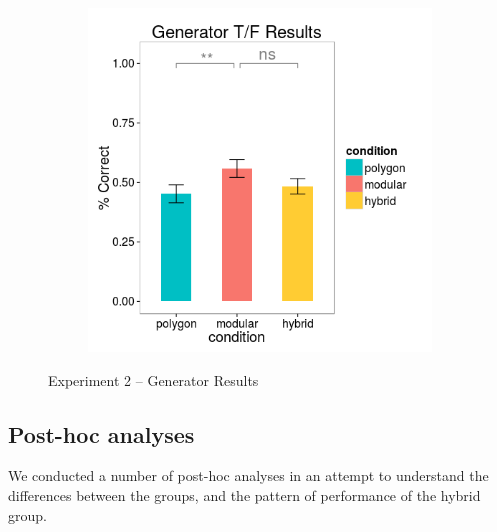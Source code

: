 \documentclass[11pt]{article}
\begin{document}
\begin{figure}[H]
\begin{subfigure}[c]{0.4\textwidth}
\includegraphics[width=\textwidth]{figures/2/gen_TF_r.png}
\end{subfigure}
\caption{Experiment 2 -- Generator Results}
\label{ex2_gen}
\end{figure}\noindent 
\subsection{Post-hoc analyses}
We conducted a number of post-hoc analyses in an attempt to understand the differences between the groups, and the pattern of performance of the hybrid group. 
\end{document}
